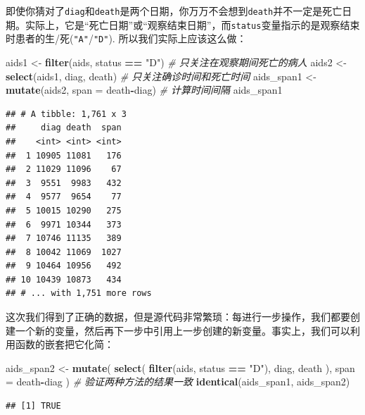 \documentclass[]{book}
\newenvironment{Shaded}{\begin{snugshade}}{\end{snugshade}}
\newcommand{\CommentTok}[1]{\textcolor[rgb]{0.56,0.35,0.01}{\textit{#1}}}
\newcommand{\DataTypeTok}[1]{\textcolor[rgb]{0.13,0.29,0.53}{#1}}
\newcommand{\KeywordTok}[1]{\textcolor[rgb]{0.13,0.29,0.53}{\textbf{#1}}}
\newcommand{\NormalTok}[1]{#1}
\newcommand{\OperatorTok}[1]{\textcolor[rgb]{0.81,0.36,0.00}{\textbf{#1}}}
\newcommand{\StringTok}[1]{\textcolor[rgb]{0.31,0.60,0.02}{#1}}
\begin{document}
即使你猜对了\texttt{diag}和\texttt{death}是两个日期，你万万不会想到\texttt{death}并不一定是死亡日期。实际上，它是``死亡日期''或``观察结束日期''，而\texttt{status}变量指示的是观察结束时患者的生/死(\texttt{"A"}/\texttt{"D"}). 所以我们实际上应该这么做：

\begin{Shaded}
\begin{Highlighting}[]
\NormalTok{aids1 <-}\StringTok{ }\KeywordTok{filter}\NormalTok{(aids, status }\OperatorTok{==}\StringTok{ "D"}\NormalTok{) }\CommentTok{# 只关注在观察期间死亡的病人}
\NormalTok{aids2 <-}\StringTok{ }\KeywordTok{select}\NormalTok{(aids1, diag, death) }\CommentTok{# 只关注确诊时间和死亡时间}
\NormalTok{aids_span1 <-}\StringTok{ }\KeywordTok{mutate}\NormalTok{(aids2, }\DataTypeTok{span =}\NormalTok{ death}\OperatorTok{-}\NormalTok{diag) }\CommentTok{# 计算时间间隔}
\NormalTok{aids_span1}
\end{Highlighting}
\end{Shaded}

\begin{verbatim}
## # A tibble: 1,761 x 3
##     diag death  span
##    <int> <int> <int>
##  1 10905 11081   176
##  2 11029 11096    67
##  3  9551  9983   432
##  4  9577  9654    77
##  5 10015 10290   275
##  6  9971 10344   373
##  7 10746 11135   389
##  8 10042 11069  1027
##  9 10464 10956   492
## 10 10439 10873   434
## # ... with 1,751 more rows
\end{verbatim}

这次我们得到了正确的数据，但是源代码非常繁琐：每进行一步操作，我们都要创建一个新的变量，然后再下一步中引用上一步创建的新变量。事实上，我们可以利用函数的嵌套把它化简：

\begin{Shaded}
\begin{Highlighting}[]
\NormalTok{aids_span2 <-}\StringTok{ }\KeywordTok{mutate}\NormalTok{(}
  \KeywordTok{select}\NormalTok{(}
    \KeywordTok{filter}\NormalTok{(aids, status }\OperatorTok{==}\StringTok{ "D"}\NormalTok{),}
\NormalTok{    diag, death}
\NormalTok{  ),}
  \DataTypeTok{span =}\NormalTok{ death}\OperatorTok{-}\NormalTok{diag}
\NormalTok{)}
\CommentTok{# 验证两种方法的结果一致}
\KeywordTok{identical}\NormalTok{(aids_span1, aids_span2)}
\end{Highlighting}
\end{Shaded}

\begin{verbatim}
## [1] TRUE
\end{verbatim}
\end{document}
